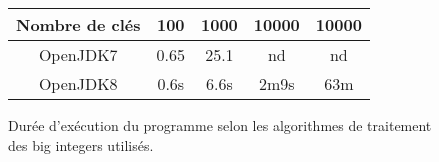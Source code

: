 \documentclass[a4paper,10pt]{article}
\begin{document}
\begin{figure}[ht]
  \begin{center}
    \begin{tabular}{ccccc}
      \toprule
      Nombre de clés & 100 & 1000 & 10000 & 10000\\
      \toprule
      OpenJDK7 & 0.65 & 25.1 & nd & nd\\
      \midrule
      OpenJDK8 & 0.6s & 6.6s & 2m9s & 63m\\
      \bottomrule
    \end{tabular}
    \caption{\label{tab:jdkVersions}Durée d'exécution du programme selon les algorithmes de traitement des big integers utilisés.}
    
  \end{center}
\end{figure}
\end{document}
